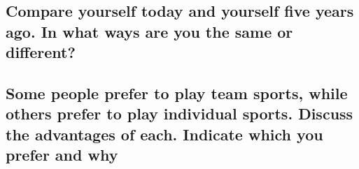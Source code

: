 \documentclass{article}
\begin{document}
\subsection*{Compare yourself today and yourself five years ago. In what ways are
you the same or different?}

\subsection*{Some people prefer to play team sports, while others prefer to play
individual sports. Discuss the advantages of each. Indicate which you prefer
and why}
\end{document}
